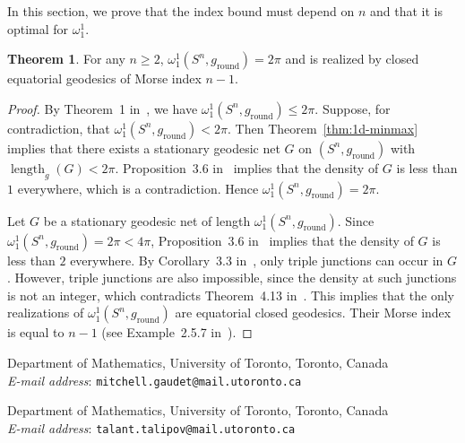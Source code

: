 \documentclass[12pt,english]{article}
\theoremstyle{definition}
\newtheorem{theorem}{Theorem}[section]
\begin{document}
In this section, we prove that the index bound must depend on $n$ and that it is optimal for $\omega_1^1$.

\begin{theorem}
    For any $n \geq 2$, $\omega_1^1(S^n, g_{\operatorname{round}}) = 2\pi$ and is realized by closed equatorial geodesics of Morse index $n - 1$.
\end{theorem}

\begin{proof}
    By Theorem~1 in~\cite{Rademacher}, we have $\omega_1^1(S^n, g_{\operatorname{round}}) \leq 2\pi$. Suppose, for contradiction, that $\omega_1^1(S^n, g_{\operatorname{round}}) < 2\pi$. Then Theorem~\ref{thm:1d-minmax} implies that there exists a stationary geodesic net $G$ on $(S^n, g_{\operatorname{round}})$ with $\operatorname{length}_g(G) < 2\pi$. Proposition~3.6 in~\cite{aiex} implies that the density of $G$ is less than $1$ everywhere, which is a contradiction. Hence $\omega_1^1(S^n, g_{\operatorname{round}}) = 2\pi$.

    Let $G$ be a stationary geodesic net of length $\omega_1^1(S^n, g_{\operatorname{round}})$. Since $\omega_1^1(S^n, g_{\operatorname{round}}) = 2\pi < 4\pi$, Proposition~3.6 in~\cite{aiex} implies that the density of $G$ is less than $2$ everywhere. By Corollary~3.3 in~\cite{aiex}, only triple junctions can occur in $G$. However, triple junctions are also impossible, since the density at such junctions is not an integer, which contradicts Theorem~4.13 in~\cite{aiex}. This implies that the only realizations of $\omega_1^1(S^n, g_{\operatorname{round}})$ are equatorial closed geodesics. Their Morse index is equal to $n - 1$ (see Example~2.5.7 in~\cite{Klingenberg}).
\end{proof}

\printbibliography

\vspace{0.5cm} %
\noindent Department of Mathematics, University of Toronto, Toronto, Canada\\
\textit{E-mail address}: \texttt{mitchell.gaudet@mail.utoronto.ca}

\vspace{0.5cm} %
\noindent Department of Mathematics, University of Toronto, Toronto, Canada\\
\textit{E-mail address}: \texttt{talant.talipov@mail.utoronto.ca}
\end{document}
